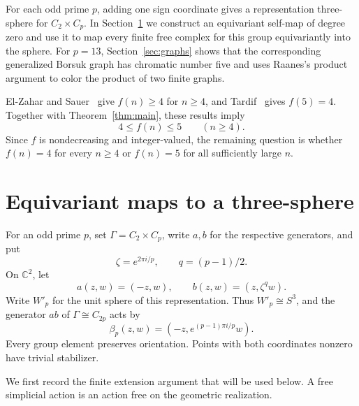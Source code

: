 \documentclass[11pt]{amsart}
\theoremstyle{definition}
\theoremstyle{remark}
\numberwithin{equation}{section}
\newcommand{\C}{\mathbb C}
\begin{document}
For each odd prime $p$, adding one sign coordinate gives a representation three-sphere for $C_2\times C_p$. In Section~\ref{sec:maps} we construct an equivariant self-map of degree zero and use it to map every finite free complex for this group equivariantly into the sphere. For $p=13$, Section~\ref{sec:graphs} shows that the corresponding generalized Borsuk graph has chromatic number five and uses Raanes's product argument to color the product of two finite graphs.

El-Zahar and Sauer~\cite{ElZaharSauer} give $f(n)\geq4$ for $n\geq4$, and Tardif~\cite{Tardif} gives $f(5)=4$. Together with Theorem~\ref{thm:main}, these results imply
\[
 4\leq f(n)\leq5\qquad(n\geq4).
\]
Since $f$ is nondecreasing and integer-valued, the remaining question is whether $f(n)=4$ for every $n\geq4$ or $f(n)=5$ for all sufficiently large $n$.

\section{Equivariant maps to a three-sphere}\label{sec:maps}

For an odd prime $p$, set $\Gamma=C_2\times C_p$, write $a,b$ for the respective generators, and put
\[
 \zeta=e^{2\pi i/p},\qquad q=(p-1)/2.
\]
On $\C^2$, let
\begin{equation}\label{eq:action}
 a(z,w)=(-z,w),\qquad b(z,w)=(z,\zeta^q w).
\end{equation}
Write $W'_p$ for the unit sphere of this representation. Thus $W'_p\cong S^3$, and the generator $ab$ of $\Gamma\cong C_{2p}$ acts by
\begin{equation}\label{eq:beta}
 \beta_p(z,w)=(-z,e^{(p-1)\pi i/p}w).
\end{equation}
Every group element preserves orientation. Points with both coordinates nonzero have trivial stabilizer.

We first record the finite extension argument that will be used below. A free simplicial action is an action free on the geometric realization.
\end{document}
